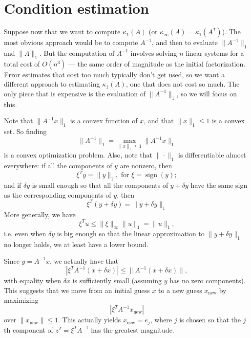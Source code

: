 \section{Condition estimation}

Suppose now that we want to compute $\kappa_1(A)$
(or $\kappa_{\infty}(A) = \kappa_1(A^T)$).
The most obvious approach would be to compute $A^{-1}$, and then
to evaluate $\|A^{-1}\|_1$ and $\|A\|_1$.  But the computation of
$A^{-1}$ involves solving $n$ linear systems for a total cost of $O(n^3)$ ---
the same order of magnitude as the initial factorization.  Error estimates
that cost too much typically don't get used, so we want a different approach
to estimating $\kappa_1(A)$, one that does not cost so much.  The only piece
that is expensive is the evaluation of $\|A^{-1}\|_1$, so we will focus
on this.

Note that $\|A^{-1} x\|_1$ is a convex function of $x$, and that
$\|x\|_1 \leq 1$ is a convex set.  So finding
\[
  \|A^{-1}\|_1 = \max_{\|x\|_1 \leq 1} \|A^{-1} x\|_1
\]
is a convex optimization problem.  Also, note that $\|\cdot\|_1$ is
differentiable almost everywhere: if all the components of $y$ are
nonzero, then
\[
  \xi^T y = \|y\|_1, \mbox{ for } \xi = \operatorname{sign}(y);
\]
and if $\delta y$ is small enough so that all the components of $y + \delta y$
have the same sign as the corresponding components of $y$, then
\[
 \xi^T (y+\delta y) = \|y+\delta y\|_1
\]
More generally, we have
\[
  \xi^T u \leq \|\xi\|_{\infty} \|u\|_1 = \|u\|_1,
\]
i.e. even when $\delta y$ is big enough so that the linear approximation
to $\|y+\delta y\|_1$ no longer holds, we at least have a lower bound.

Since $y = A^{-1} x$, we actually have that
\[
  |\xi^T A^{-1} (x+\delta x)| \leq \|A^{-1} (x+\delta x)\|,
\]
with equality when $\delta x$ is sufficiently small (assuming $y$ has
no zero components).  This suggests that we move from an initial guess $x$
to a new guess $x_{\mathrm{new}}$ by maximizing
\[
  |\xi^T A^{-1} x_{\mathrm{new}}|
\]
over $\|x_{\mathrm{new}}\| \leq 1$.  This actually yields $x_{\mathrm{new}} = e_j$,
where $j$ is chosen so that the $j$th component of
$z^T = \xi^T A^{-1}$ has the greatest magnitude.

